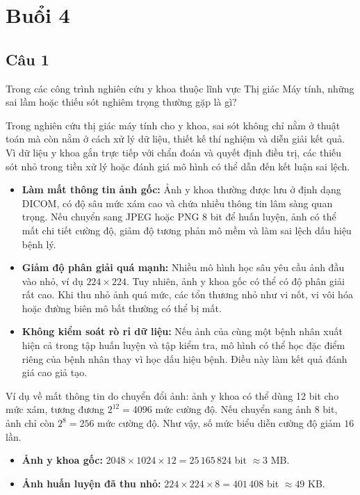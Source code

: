 \chapter{Buổi 4}
\label{Chapter4}
\setcounter{secnumdepth}{5}

\section*{Câu 1}
Trong các công trình nghiên cứu y khoa thuộc lĩnh vực Thị giác Máy tính, những sai lầm hoặc thiếu sót nghiêm trọng thường gặp là gì?

Trong nghiên cứu thị giác máy tính cho y khoa, sai sót không chỉ nằm ở thuật toán mà còn nằm ở cách xử lý dữ liệu, thiết kế thí nghiệm và diễn giải kết quả. Vì dữ liệu y khoa gắn trực tiếp với chẩn đoán và quyết định điều trị, các thiếu sót nhỏ trong tiền xử lý hoặc đánh giá mô hình có thể dẫn đến kết luận sai lệch.

\begin{itemize}
    \item \textbf{Làm mất thông tin ảnh gốc:} Ảnh y khoa thường được lưu ở định dạng DICOM, có độ sâu mức xám cao và chứa nhiều thông tin lâm sàng quan trọng. Nếu chuyển sang JPEG hoặc PNG 8 bit để huấn luyện, ảnh có thể mất chi tiết cường độ, giảm độ tương phản mô mềm và làm sai lệch dấu hiệu bệnh lý.

    \item \textbf{Giảm độ phân giải quá mạnh:} Nhiều mô hình học sâu yêu cầu ảnh đầu vào nhỏ, ví dụ $224 \times 224$. Tuy nhiên, ảnh y khoa gốc có thể có độ phân giải rất cao. Khi thu nhỏ ảnh quá mức, các tổn thương nhỏ như vi nốt, vi vôi hóa hoặc đường biên mô bất thường có thể bị mất.

    \item \textbf{Không kiểm soát rò rỉ dữ liệu:} Nếu ảnh của cùng một bệnh nhân xuất hiện cả trong tập huấn luyện và tập kiểm tra, mô hình có thể học đặc điểm riêng của bệnh nhân thay vì học dấu hiệu bệnh. Điều này làm kết quả đánh giá cao giả tạo.
\end{itemize}

Ví dụ về mất thông tin do chuyển đổi ảnh: ảnh y khoa có thể dùng 12 bit cho mức xám, tương đương $2^{12}=4096$ mức cường độ. Nếu chuyển sang ảnh 8 bit, ảnh chỉ còn $2^8=256$ mức cường độ. Như vậy, số mức biểu diễn cường độ giảm $16$ lần.

\begin{itemize}
    \item \textbf{Ảnh y khoa gốc:} $2048 \times 1024 \times 12 = 25\,165\,824$ bit $\approx 3$ MB.

    \item \textbf{Ảnh huấn luyện đã thu nhỏ:} $224 \times 224 \times 8 = 401\,408$ bit $\approx 49$ KB.
\end{itemize}

